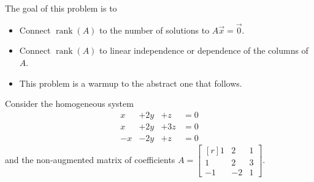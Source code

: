 \documentclass{problemset}
\DeclareMathOperator{\Rank}{rank}
\newcommand{\mat}[1]{\begin{bmatrix*}[r]#1\end{bmatrix*}}
\begin{document}
	\question
	\begin{annotation}
		\begin{goals}

			The goal of this problem is to
			\begin{itemize}
				\item Connect $\Rank(A)$ to the number of solutions to $A\vec x=\vec 0$.
				\item Connect $\Rank(A)$ to linear independence or dependence of the columns of $A$.
			\end{itemize}
		\end{goals}

		\begin{notes}
			\begin{itemize}
				\item This problem is a warmup to the abstract one that follows.
			\end{itemize}
		\end{notes}
	\end{annotation}
	Consider the homogeneous system
		\begin{equation}\label{eq4bx}
			\begin{array}{llll}
				x&+2y&+z &= 0\\
				x&+2y&+3z &= 0\\
				-x&-2y&+z &= 0
			\end{array}
		\end{equation}
	and the non-augmented matrix of coefficients $A=\mat{1&2&1\\1&2&3\\-1&-2&1}$.
\end{document}
